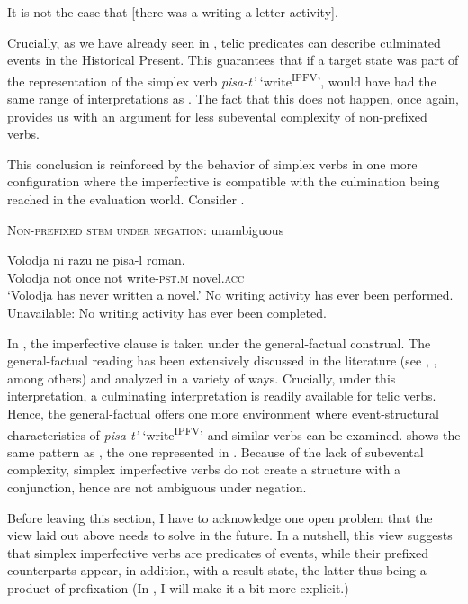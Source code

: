 \documentclass[output=paper,colorlinks,citecolor=brown]{langscibook}
\begin{document}
\ea    It is not the case that [there was a writing a letter activity].\label{tat:ex:49}
\z

\noindent Crucially, as we have already seen in , telic predicates can describe culminated events in the Historical Present. This guarantees that %
if a target state was part of the representation of the simplex verb \textit{pisa-t’} ‘write\textsuperscript{IPFV}’,  would have had the same range of interpretations as . The fact that this does not happen, once again, provides us with an argument for less subevental complexity of non-prefixed verbs.

This conclusion is reinforced by the behavior of simplex verbs in one more configuration where the imperfective is compatible with the culmination being reached in the evaluation world. Consider .

\ea    \textsc{Non-prefixed stem under negation}: unambiguous\label{ex:tatevosov:50}

\gll  Volodja  ni razu  ne  pisa-l  roman.\\
  Volodja  not once  not  write-\textsc{pst.m}  novel.\textsc{acc}\\
\glt ‘Volodja has never written a novel.’
\ea No writing activity has ever been performed.
\ex Unavailable: No writing activity has ever been completed.
\z
\z

\noindent In , the imperfective clause is taken under the general-factual construal. The general-factual reading has been extensively discussed in the literature (see \citealt{Mehlig1981,Mehlig1995,paduceva96,gronndiss,Groenn2015,Altshuler2012,Arregui.etal2014}, , among others) and analyzed in a variety of ways. Crucially, under this interpretation, a culminating interpretation is readily available for telic verbs. Hence, the general-factual offers one more environment where event-structural characteristics of \textit{pisa-t’} ‘write\textsuperscript{IPFV}’ and similar verbs can be examined.  shows the same pattern as , the one represented in . Because of the lack of subevental complexity, simplex imperfective verbs do not create a structure with a conjunction, hence are not ambiguous under negation.

Before leaving this section, I have to acknowledge one open problem that the view laid out above needs to solve in the future. In a nutshell, this view suggests that simplex imperfective verbs are predicates of events, while their prefixed counterparts appear, in addition, with a result state, the latter thus being a product of prefixation (In , I will make it a bit more explicit.) 
\end{document}
